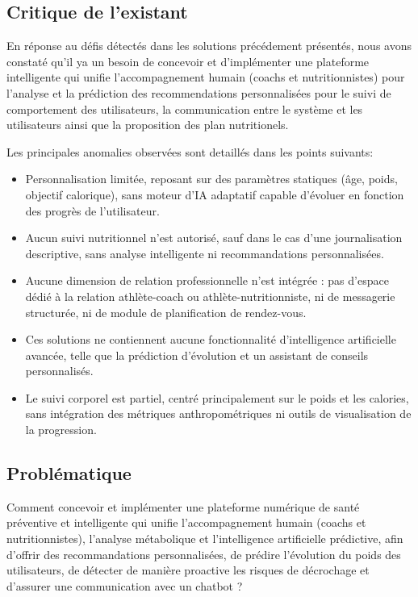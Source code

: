 \documentclass[a4paper,12pt]{report}
\begin{document}
\subsection{Critique de l'existant }
En réponse au défis détectés dans les solutions précédement présentés, nous avons constaté qu'il ya un besoin de  concevoir et d'implémenter une plateforme intelligente qui unifie l'accompagnement humain (coachs et nutritionnistes) pour l'analyse 
et la prédiction des recommendations personnalisées pour le suivi de comportement des utilisateurs, la communication entre le système et les utilisateurs ainsi que la proposition des plan nutritionels.

Les principales anomalies observées sont detaillés dans  les points suivants:

\begin{itemize}
 \item  Personnalisation limitée, reposant sur des paramètres statiques (âge, poids, objectif calorique),
 sans moteur d'IA adaptatif capable d'évoluer en fonction des progrès de l'utilisateur.
 \item Aucun suivi nutritionnel n'est autorisé, sauf dans le cas d'une journalisation descriptive, 
 sans analyse intelligente ni recommandations personnalisées.
 \item Aucune dimension de relation professionnelle n'est intégrée : pas d'espace dédié à la relation athlète-coach ou athlète-nutritionniste, 
 ni de messagerie structurée, ni de module de planification de rendez-vous.
 \item Ces solutions ne contiennent aucune fonctionnalité d'intelligence artificielle avancée, telle que la prédiction d'évolution et  un assistant de conseils personnalisés.
 \item Le suivi corporel est partiel, centré principalement sur le poids et les calories, sans intégration des métriques
 anthropométriques ni outils de visualisation de la progression.
 \end{itemize}
  

 

 

\subsection{Problématique}
Comment concevoir et implémenter une plateforme numérique de santé préventive et intelligente qui unifie l'accompagnement humain (coachs et nutritionnistes), l'analyse métabolique et l'intelligence artificielle prédictive, afin d'offrir des recommandations personnalisées, de prédire l'évolution du poids des utilisateurs, de détecter de manière proactive les risques de décrochage et d'assurer une communication avec un chatbot ?
\end{document}
